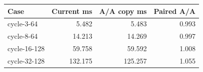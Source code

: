 \begin{center}\small
\begin{tabular}{lrrr}
\toprule
Case & Current ms & A/A copy ms & Paired A/A \\
\midrule
cycle-3-64 & 5.482 & 5.483 & 0.993 \\
cycle-8-64 & 14.213 & 14.269 & 0.997 \\
cycle-16-128 & 59.758 & 59.592 & 1.008 \\
cycle-32-128 & 132.175 & 125.257 & 1.055 \\
\bottomrule
\end{tabular}
\end{center}
